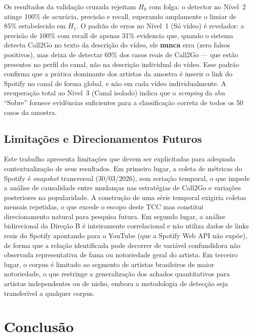 \documentclass[12pt, a4paper]{article}
\begin{document}
Os resultados da validação cruzada rejeitam $H_0$ com folga: o detector no Nível~2 atinge 100\% de acurácia, precisão e recall, superando amplamente o limiar de 85\% estabelecido em $H_1$. O padrão de erros no Nível~1 (Só vídeo) é revelador: a precisão de 100\% com recall de apenas 31\% evidencia que, quando o sistema detecta Call2Go no texto da descrição do vídeo, ele \textbf{nunca} erra (zero falsos positivos), mas deixa de detectar 69\% dos casos reais de Call2Go --- que estão presentes no perfil do canal, não na descrição individual do vídeo. Esse padrão confirma que a prática dominante dos artistas da amostra é inserir o link do Spotify no canal de forma global, e não em cada vídeo individualmente. A recuperação total ao Nível~3 (Canal isolado) indica que o \textit{scraping} da aba ``Sobre'' fornece evidências suficientes para a classificação correta de todos os 50 casos da amostra.

\subsection{Limitações e Direcionamentos Futuros}

Este trabalho apresenta limitações que devem ser explicitadas para adequada contextualização de seus resultados. Em primeiro lugar, a coleta de métricas do Spotify é \textit{snapshot} transversal (30/03/2026), sem seriação temporal, o que impede a análise de causalidade entre mudanças nas estratégias de Call2Go e variações posteriores na popularidade. A construção de uma série temporal exigiria coletas mensais repetidas, o que excede o escopo deste TCC mas constitui direcionamento natural para pesquisa futura. Em segundo lugar, a análise bidirecional da Direção B é inteiramente correlacional e não utiliza dados de links reais do Spotify apontando para o YouTube (que a Spotify Web API não expõe), de forma que a relação identificada pode decorrer de variável confundidora não observada representativa de fama ou notoriedade geral do artista. Em terceiro lugar, o corpus é limitado ao segmento de artistas brasileiros de maior notoriedade, o que restringe a generalização dos achados quantitativos para artistas independentes ou de nicho, embora a metodologia de detecção seja transferível a qualquer corpus.

\section{Conclusão}
\label{sec:conclusao}
\end{document}
